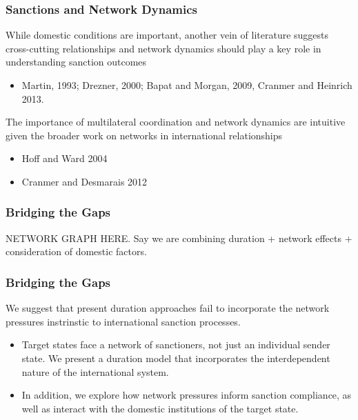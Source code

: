 \documentclass{beamer}
\begin{document}
\begin{frame}
\frametitle{Sanctions and Network Dynamics}
While domestic conditions are important, another vein of literature suggests cross-cutting relationships and network dynamics should play a key role in understanding sanction outcomes 
\begin{itemize}
\item Martin, 1993; Drezner, 2000; Bapat and Morgan, 2009, Cranmer and Heinrich 2013. 
\end{itemize}

The importance of multilateral coordination and network dynamics are intuitive given the broader work on networks in international relationships 
\begin{itemize}
\item Hoff and Ward 2004
\item Cranmer and Desmarais 2012
\end{itemize} 
\end{frame}

\begin{frame}
\frametitle{Bridging the Gaps}
NETWORK GRAPH HERE. Say we are combining duration + network effects + consideration of domestic factors. 
\end{frame}

\begin{frame}
\frametitle{Bridging the Gaps}
We suggest that present duration approaches fail to incorporate the network pressures instrinstic to international sanction processes. 

\begin{itemize}
\item Target states face a network of sanctioners, not just an individual sender state. We present a duration model that incorporates the interdependent nature of the international system. 
\item In addition, we explore how network pressures inform sanction compliance, as well as interact with the domestic institutions of the target state. 
\end{itemize}
\end{frame}

\end{document}
